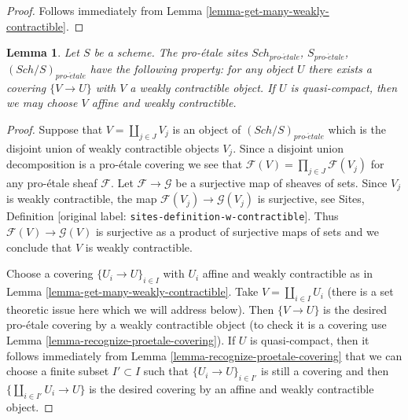 \documentclass[10pt,a4paper]{article}
\theoremstyle{plain}
\newtheorem{lemma}[subsection]{Lemma}
\theoremstyle{definition}
\theoremstyle{remark}
\numberwithin{equation}{subsection}
\def\Sch{\mathit{Sch}}
\def\proetale{{pro\text{-}\acute{e}tale}}
\begin{document}
\begin{proof}
Follows immediately from Lemma \ref{lemma-get-many-weakly-contractible}.
\end{proof}

\begin{lemma}
\label{lemma-weakly-contractible-cover}
Let $S$ be a scheme. The pro-\'etale sites
$\Sch_\proetale$, $S_\proetale$, $(\Sch/S)_\proetale$
have the following property: for any object
$U$ there exists a covering $\{V \to U\}$ with $V$ a
weakly contractible object. If $U$ is quasi-compact, then we
may choose $V$ affine and weakly contractible.
\end{lemma}

\begin{proof}
Suppose that $V = \coprod_{j \in J} V_j$ is an object of $(\Sch/S)_\proetale$
which is the disjoint union of weakly contractible objects $V_j$.
Since a disjoint union decomposition is a pro-\'etale covering we
see that $\mathcal{F}(V) = \prod_{j \in J} \mathcal{F}(V_j)$ for any
pro-\'etale sheaf $\mathcal{F}$. Let $\mathcal{F} \to \mathcal{G}$
be a surjective map of sheaves of sets. Since $V_j$ is weakly contractible,
the map $\mathcal{F}(V_j) \to \mathcal{G}(V_j)$ is surjective, see
Sites, Definition \textnormal{[original label: \nolinkurl{sites-definition-w-contractible}]}.
Thus $\mathcal{F}(V) \to \mathcal{G}(V)$ is surjective as a product
of surjective maps of sets and we conclude that $V$ is weakly contractible.

\medskip\noindent
Choose a covering $\{U_i \to U\}_{i \in I}$ with $U_i$ affine and
weakly contractible as in Lemma \ref{lemma-get-many-weakly-contractible}.
Take $V = \coprod_{i \in I} U_i$ (there is a set theoretic issue here
which we will address below). Then $\{V \to U\}$ is the desired
pro-\'etale covering by a weakly contractible object
(to check it is a covering use
Lemma \ref{lemma-recognize-proetale-covering}).
If $U$ is quasi-compact, then it follows immediately from
Lemma \ref{lemma-recognize-proetale-covering}
that we can choose a finite subset $I' \subset I$ such that
$\{U_i \to U\}_{i \in I'}$ is still a covering
and then $\{\coprod_{i \in I'} U_i \to U\}$ is the desired covering
by an affine and weakly contractible object.


\end{proof}
\end{document}
